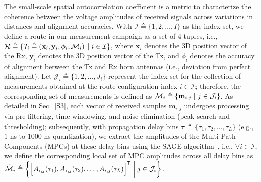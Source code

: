 \documentclass[12pt, draftcls, onecolumn]{IEEEtran}
\newcommand{\suchthat}{\;\ifnum\currentgrouptype=16 \middle\fi|\;}
\begin{document}
{The small-scale spatial autocorrelation coefficient is a metric to characterize the coherence between the voltage amplitudes of received signals across variations in distances and alignment accuracies. With $\mathcal{I} \triangleq \{1,2,{\dots},I\}$ as the index set, we define a route in our measurement campaign as a set of $4$-tuples, i.e., $\mathcal{R} \triangleq \{\mathcal{T}_{i} \triangleq \left(\mathbf{x}_{i}, \mathbf{y}_{i}, \phi_{i}, \mathcal{M}_{i}\right) \suchthat i \in \mathcal{I}\}$, where $\mathbf{x}_{i}$ denotes the $3$D position vector of the Rx, $\mathbf{y}_{i}$ denotes the $3$D position vector of the Tx, and $\phi_{i}$ denotes the accuracy of alignment between the Tx and Rx horn antennas (i.e., deviation from perfect alignment). Let $\mathcal{J}_{i} \triangleq \{1,2,{\dots},J_{i}\}$ represent the index set for the collection of measurements obtained at the route configuration index $i \in \mathcal{I}$; therefore, the corresponding set of measurements is defined as $\mathcal{M}_{i} \triangleq \{\mathbf{m}_{i,j} \suchthat j \in \mathcal{J}_{i}\}$. As detailed in Sec.~\ref{S3}, each vector of received samples $\mathbf{m}_{i,j}$ undergoes processing via pre-filtering, time-windowing, and noise elimination (peak-search and thresholding); subsequently, with propagation delay bins $\boldsymbol{\tau} \triangleq \{\tau_{1},\tau_{2},{\dots},\tau_{L}\}$ (e.g., $1$ ns to $1000$ ns quantization), we extract the amplitudes of the Multi-Path Components (MPCs) at these delay bins using the SAGE algorithm~\cite{SAGE}, i.e., $\forall i \in \mathcal{I}$, we define the corresponding local set of MPC amplitudes across all delay bins as $\tilde{\mathcal{M}}_{i} \triangleq \left\{\Big[A_{i,j}(\tau_{1}), A_{i,j}(\tau_{2}), \dots, A_{i,j}(\tau_{L})\Big]^{\mathsf{T}} \suchthat j \in \mathcal{J}_{i}\right\}$.

}
\end{document}
